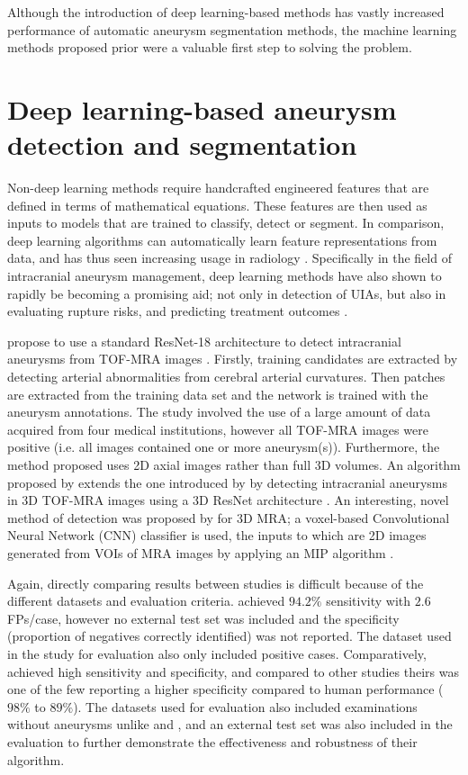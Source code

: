 Although the introduction of deep learning-based methods has vastly increased performance of automatic aneurysm segmentation methods, the machine learning methods proposed prior were a valuable first step to solving the problem. 

\section{Deep learning-based aneurysm detection and segmentation}
Non-deep learning methods require handcrafted engineered features that are defined in terms of mathematical equations. These features are then used as inputs to models that are trained to classify, detect or segment. In comparison, deep learning algorithms can automatically learn feature representations from data, and has thus seen increasing usage in radiology \cite{Hosny2018}. Specifically in the field of intracranial aneurysm management, deep learning methods have also shown to rapidly be becoming a promising aid; not only in detection of UIAs, but also in evaluating rupture risks, and predicting treatment outcomes \cite{Shi2020}.

\citeauthor{Ueda2019} propose to use a standard ResNet-18 architecture to detect intracranial aneurysms from TOF-MRA images \cite{He2016, Ueda2019}. Firstly, training candidates are extracted by detecting arterial abnormalities from cerebral arterial curvatures. Then patches are extracted from the training data set and the network is trained with the aneurysm annotations. The study involved the use of a large amount of data acquired from four medical institutions, however all TOF-MRA images were positive (i.e. all images contained one or more aneurysm(s)). Furthermore, the method proposed uses 2D axial images rather than full 3D volumes. An algorithm proposed by \citeauthor{Joo2020} extends the one introduced by \citeauthor{Ueda2019} by detecting intracranial aneurysms in 3D TOF-MRA images using a 3D ResNet architecture \cite{He2016, Joo2020}. An interesting, novel method of detection was proposed by \citeauthor{Nakao2018} for 3D MRA; a voxel-based Convolutional Neural Network (CNN) classifier is used, the inputs to which are 2D images generated from VOIs of MRA images by applying an MIP algorithm \cite{Nakao2018}. 

Again, directly comparing results between studies is difficult because of the different datasets and evaluation criteria. \citeauthor{Nakao2018} achieved $94.2\%$ sensitivity with $2.6$ FPs/case, however no external test set was included and the specificity (proportion of negatives correctly identified) was not reported. The dataset used in the study for evaluation also only included positive cases. Comparatively, \citeauthor{Joo2020} achieved high sensitivity and specificity, and compared to other studies theirs was one of the few reporting a higher specificity compared to human performance ($98\%$ to $89\%$). The datasets used for evaluation also included examinations without aneurysms unlike \citeauthor{Ueda2019} and \citeauthor{Nakao2018}, and an external test set was also included in the evaluation to further demonstrate the effectiveness and robustness of their algorithm.

